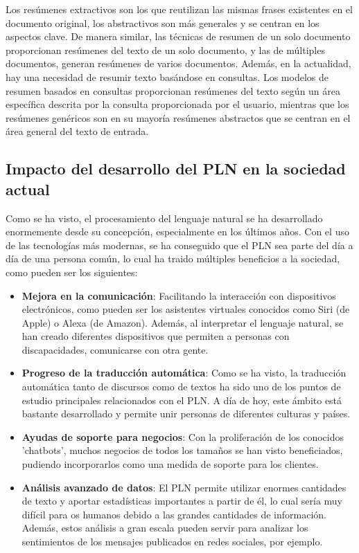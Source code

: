 Los resúmenes extractivos son los que reutilizan las mismas frases existentes en el documento original, los abstractivos son más generales y se centran en los aspectos clave. De manera similar, las técnicas de resumen de un solo documento proporcionan resúmenes del texto de un solo documento, y las de múltiples documentos, generan resúmenes de varios documentos. Además, en la actualidad, hay una necesidad de resumir texto basándose en consultas. Los modelos de resumen basados en consultas proporcionan resúmenes del texto según un área específica descrita por la consulta proporcionada por el usuario, mientras que los resúmenes genéricos son en su mayoría resúmenes abstractos que se centran en el área general del texto de entrada.

\subsection{Impacto del desarrollo del PLN en la sociedad actual}

Como se ha visto, el procesamiento del lenguaje natural se ha desarrollado enormemente desde su concepción, especialmente en los últimos años. Con el uso de las tecnologías más modernas, se ha conseguido que el PLN sea parte del día a día de una persona común, lo cual ha traido múltiples beneficios a la sociedad, como pueden ser los siguientes:

\begin{itemize}
	\item \textbf{Mejora en la comunicación}: Facilitando la interacción con dispositivos electrónicos, como pueden ser los asistentes virtuales conocidos como Siri (de Apple) o Alexa (de Amazon). Además, al interpretar el lenguaje natural, se han creado diferentes dispositivos que permiten a personas con discapacidades, comunicarse con otra gente.
	
	\item \textbf{Progreso de la traducción automática}: Como se ha visto, la traducción automática tanto de discursos como de textos ha sido uno de los puntos de estudio principales relacionados con el PLN. A día de hoy, este ámbito está bastante desarrollado y permite unir personas de diferentes culturas y países.
	
	\item \textbf{Ayudas de soporte para negocios}: Con la proliferación de los conocidos 'chatbots', muchos negocios de todos los tamaños se han visto beneficiados, pudiendo incorporarlos como una medida de soporte para los clientes.
	
	\item \textbf{Análisis avanzado de datos}: El PLN permite utilizar enormes cantidades de texto y aportar estadísticas importantes a partir de él, lo cual sería muy difícil para os humanos debido a las grandes cantidades de información. Además, estos análisis a gran escala pueden servir para analizar los sentimientos de los mensajes publicados en redes sociales, por ejemplo.
\end{itemize}

